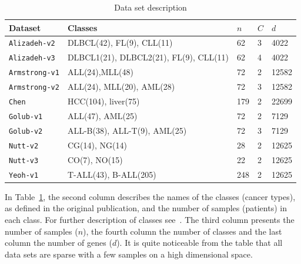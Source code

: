 \documentclass[runningheads,a4paper]{llncs}
\begin{document}
\begin{table}[htp]
\caption{Data set description \label{dataset}}
\begin{center}
\begin{footnotesize}
\begin{tabular}{|l|l|l|l|l|}
 \hline \bf{Dataset} & \bf{Classes} & \bf{$n$} &\bf{$C$} & \bf{$d$} \\
 \hline 
{\tt Alizadeh-v2} & DLBCL(42), FL(9), CLL(11) & 62 &3 & 4022
 \\
{\tt Alizadeh-v3}           & DLBCL1(21), DLBCL2(21), FL(9), CLL(11)      	&62		    	&4            	&4022 		\\ 
{\tt Armstrong-v1} 			& ALL(24),MLL(48)				& 72        	&2       		& 12582    \\
{\tt Armstrong-v2} 			& ALL(24), MLL(20), AML(28)		& 72    		&3       		& 12582    \\
{\tt Chen}         			& HCC(104), liver(75)			& 179         	&2       		& 22699         \\
{\tt Golub-v1}     			& ALL(47), AML(25)				& 72         	&2       		& 7129  \\
{\tt Golub-v2}     			& ALL-B(38), ALL-T(9), AML(25)	& 72         	&3       		& 7129         	\\
{\tt Nutt-v2}      			& CG(14), NG(14)   	 			& 28         	&2       		& 12625 \\
{\tt Nutt-v3}      			& CO(7), NO(15)      			& 22          	&2       		& 12625         \\
{\tt Yeoh-v1}      			& T-ALL(43), B-ALL(205)			& 248         	&2       		& 12625        	\\
\hline
\end{tabular}
\end{footnotesize}
\end{center}
\end{table}

In Table~\ref{dataset}, the second column describes the names of the
classes (cancer types), as defined in the original publication, and
the number of samples (patients) in each class. For further
description of classes see~\cite{Souto2008}. The third column presents
the number of samples ($n$), the fourth column the number of classes
and the last column the number of genes ($d$). It is quite noticeable
from the table that all data sets are sparse with a few samples on a
high dimensional space.
\end{document}
